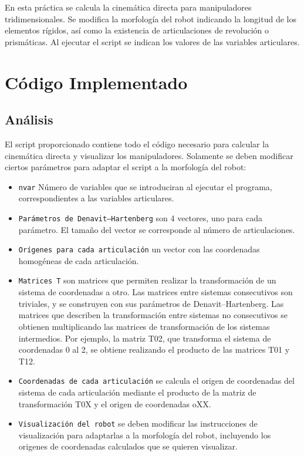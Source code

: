 En esta práctica se calcula la cinemática directa para manipuladores tridimensionales. 
Se modifica la morfología del robot indicando la longitud de los elementos rígidos, así como la existencia de articulaciones de revolución o prismáticas.
Al ejecutar el script se indican los valores de las variables articulares.

\section{Código Implementado}
\subsection{Análisis}
El script proporcionado contiene todo el código necesario para calcular la cinemática directa y visualizar los manipuladores. 
Solamente se deben modificar ciertos parámetros para adaptar el script a la morfología del robot:
\begin{itemize}
   \item \texttt{nvar} Número de variables que se introduciran al ejecutar el programa, correspondientes a las variables articulares.
   \item \texttt{Parámetros de Denavit–Hartenberg} son 4 vectores, uno para cada parámetro. El tamaño del vector se corresponde al número de articulaciones.
   \item \texttt{Orígenes para cada articulación} un vector con las coordenadas homogéneas de cada articulación.
   \item \texttt{Matrices T} son matrices que permiten realizar la transformación de un sistema de coordenadas a otro.
   Las matrices entre sistemas consecutivos son triviales, y se construyen con sus parámetros de Denavit–Hartenberg.
   Las matrices que describen la transformación entre sistemas no consecutivos se obtienen multiplicando las matrices de transformación de los sistemas intermedios.
   Por ejemplo, la matriz T02, que transforma el sistema de coordenadas 0 al 2, se obtiene realizando el producto de las matrices T01 y T12.
   \item \texttt{Coordenadas de cada articulación} se calcula el origen de coordenadas del sistema de cada articulación mediante el producto de la matriz de transformación T0X y el origen de coordenadas oXX.
   \item \texttt{Visualización del robot} se deben modificar las instrucciones de visualización para adaptarlas a la morfología del robot, incluyendo los origenes de coordenadas calculados que se quieren visualizar.
\end{itemize}

